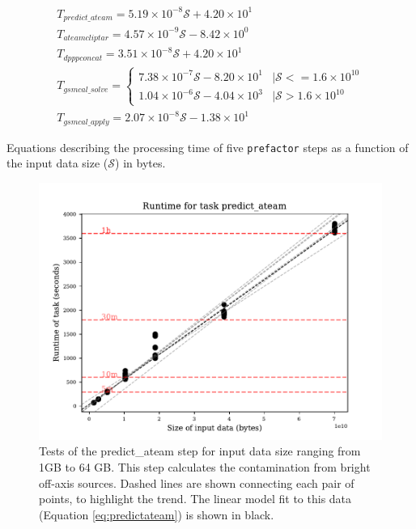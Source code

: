 \documentclass[preprint,5p]{elsarticle}
\begin{document}
\begin{equ*}
\begin{subequations}
\begin{align}
        T_{predict\_ateam}=5.19\times10^{-8}\mathcal{S}+4.20\times10^1 \label{eq:predictateam} \\
        T_{ateamcliptar}=4.57\times10^{-9}\mathcal{S}-8.42\times10^0 \label{eq:ateamcliptar} \\
        T_{dpppconcat}=3.51\times10^{-8}\mathcal{S}+4.20\times10^1 \label{eq:dpppconcat} \\
        T_{gsmcal\_solve}=\begin{cases}
                          7.38\times10^{-7}\mathcal{S}-8.20\times10^1 &|\mathcal{S}<=1.6\times10^{10}\\
                          1.04\times10^{-6}\mathcal{S}-4.04\times10^3 & |\mathcal{S}>1.6\times10^{10}
    \end{cases} \label{eq:gsmcalsolve} \\
        T_{gsmcal\_apply}=2.07\times10^{-8}\mathcal{S}-1.38\times10^1 \label{eq:gsmcalapply}    
\end{align}
\label{eq:runtime_size_models}
\end{subequations}
\caption{Equations describing the processing time of five \texttt{prefactor} steps as a function of the input data size ($\mathcal{S}$) in bytes.}
\end{equ*}

\begin{figure}
    \includegraphics[width=0.95\linewidth]{figures/predict_ateam_size.pdf}
      \caption{Tests of the predict\_ateam step for input data size ranging from 1GB to 64 GB. This step calculates the contamination from bright off-axis sources. Dashed lines are shown connecting each pair of points, to highlight the trend. The linear model fit to this data (Equation \ref{eq:predictateam}) is shown in black. }
	\label{fig:predict_ateam}
\end{figure}
\end{document}

